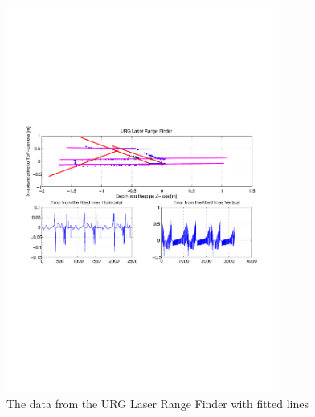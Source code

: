 \begin{figure}[htbp]
    \centering
    \includegraphics[width=0.8\textwidth]{pics/longpipe-urg-2d}
    \caption{The data from the URG Laser Range Finder with fitted lines}
    \label{chap7:fig-longpipe-urg-2d}
\end{figure}






